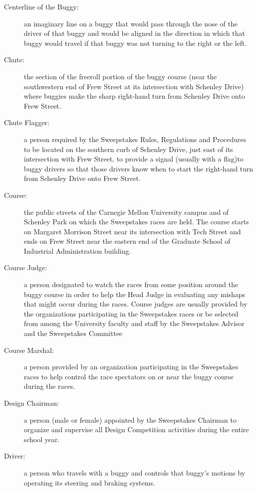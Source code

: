\begin{description}
	\item[Centerline of the Buggy:]
	an imaginary line on a buggy that would pass through the nose of the driver
	of that buggy and would be aligned in the direction in which that buggy would
	travel if that buggy was not turning to the right or the left.

	\item[Chute:]
	the section of the freeroll portion of the buggy course (near the
	southwestern end of Frew Street at its intersection with Schenley Drive) where
	buggies make the sharp right-hand turn from Schenley Drive onto Frew Street.

	\item[Chute Flagger:]
	a person required by the Sweepstakes Rules, Regulations and Procedures to
	be located on the southern curb of Schenley Drive, just east of its
	intersection with Frew Street, to provide a signal (usually with a flag)to
	buggy drivers so that those drivers know when to start the right-hand turn from
	Schenley Drive onto Frew Street.

	\item[Course:]
	the public streets of the Carnegie Mellon University campus and of Schenley
	Park on which the Sweepstakes races are held. The course starts on Margaret
	Morrison Street near its intersection with Tech Street and ends on Frew Street
	near the eastern end of the Graduate School of Industrial Administration
	building.

	\item[Course Judge:]
	a person designated to watch the races from some position around the buggy
	course in order to help the Head Judge in evaluating any mishaps that might
	occur during the races. Course judges are usually provided by the organizations
	participating in the Sweepstakes races or be selected from among the University
	faculty and staff by the Sweepstakes Advisor and the Sweepstakes Committee

	\item[Course Marshal:]
	a person provided by an organization participating in the Sweepstakes races
	to help control the race spectators on or near the buggy course during the
	races.

	\item[Design Chairman:]
	a person (male or female) appointed by the Sweepstakes Chairman to organize
	and supervise all Design Competition activities during the entire school year.

	\item[Driver:]
	a person who travels with a buggy and controls that buggy's motions by
	operating its steering and braking systems.


\end{description}
